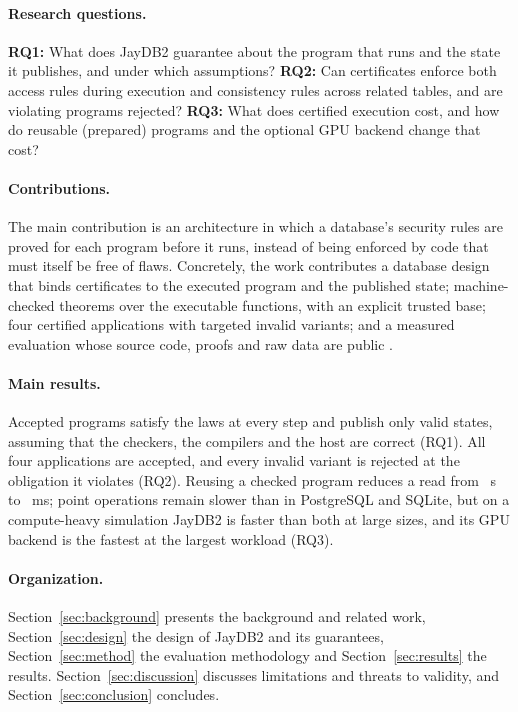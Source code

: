 \documentclass[12pt]{article}
\newcommand{\num}[1]{\pgfmathprintnumber[fixed,precision=2,1000 sep={\mathord{,}}]{#1}}
\begin{document}
\paragraph{Research questions.}
\textbf{RQ1:} What does JayDB2 guarantee about the program that runs and the
state it publishes, and under which assumptions?
\textbf{RQ2:} Can certificates enforce both access rules during execution and
consistency rules across related tables, and are violating programs rejected?
\textbf{RQ3:} What does certified execution cost, and how do reusable
(prepared) programs and the optional GPU backend change that cost?

\paragraph{Contributions.}
The main contribution is an architecture in which a database's security rules
are proved for each program before it runs, instead of being enforced by code
that must itself be free of flaws. Concretely, the work contributes a database
design that binds certificates to the executed program and the published state; machine-checked theorems over the executable
functions, with an explicit trusted base; four certified applications with
targeted invalid variants; and a measured evaluation whose source code, proofs
and raw data are public \cite{artifact}.

\paragraph{Main results.}
Accepted programs satisfy the laws at every step and publish only valid states,
assuming that the checkers, the compilers and the host are correct (RQ1). All
four applications are accepted, and every invalid variant is rejected at the
obligation it violates (RQ2). Reusing a checked program reduces a read from
\num{\OrdinaryReadMedianSeconds}~s to \num{\PreparedReadVolatileMedianMs}~ms;
point operations remain slower than in PostgreSQL and SQLite, but on a
compute-heavy simulation JayDB2 is faster than both at large sizes, and its GPU
backend is the fastest at the largest workload (RQ3).

\paragraph{Organization.}
Section~\ref{sec:background} presents the background and related work,
Section~\ref{sec:design} the design of JayDB2 and its guarantees,
Section~\ref{sec:method} the evaluation methodology and
Section~\ref{sec:results} the results. Section~\ref{sec:discussion} discusses
limitations and threats to validity, and Section~\ref{sec:conclusion} concludes.
\end{document}
